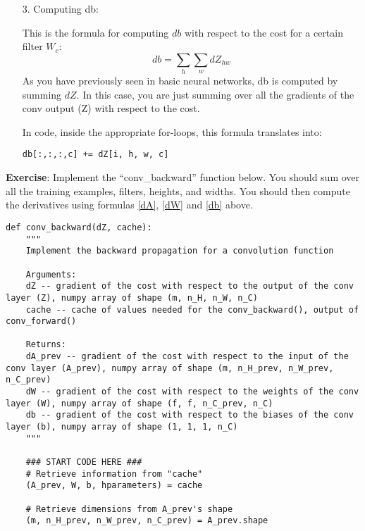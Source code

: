 {\begin{itemize}
In code, inside the appropriate for-loops, this formula translates into:
\begin{verbatim}
dW[:,:,:,c] += a_slice * dZ[i, h, w, c]
\end{verbatim}

\item[3.] Computing db:

This is the formula for computing $db$ with respect to the cost for a certain filter $W_c$:
\begin{equation}\label{db}
 db = \sum_h \sum_w dZ_{hw}
\end{equation}
As you have previously seen in basic neural networks, db is computed by summing $dZ$. In this case, you are just summing over all the gradients of the conv output (Z) with respect to the cost. 

In code, inside the appropriate for-loops, this formula translates into:
\begin{verbatim}
db[:,:,:,c] += dZ[i, h, w, c]
\end{verbatim}

\end{itemize}
{\textbf{Exercise}}: Implement the ``conv\_backward'' function below. You should sum over all the training examples, filters, heights, and widths. You should then compute the derivatives using formulas \eqref{dA}, \eqref{dW} and \eqref{db} above. 

\begin{verbatim}
def conv_backward(dZ, cache):
    """
    Implement the backward propagation for a convolution function
    
    Arguments:
    dZ -- gradient of the cost with respect to the output of the conv layer (Z), numpy array of shape (m, n_H, n_W, n_C)
    cache -- cache of values needed for the conv_backward(), output of conv_forward()
    
    Returns:
    dA_prev -- gradient of the cost with respect to the input of the conv layer (A_prev), numpy array of shape (m, n_H_prev, n_W_prev, n_C_prev)
    dW -- gradient of the cost with respect to the weights of the conv layer (W), numpy array of shape (f, f, n_C_prev, n_C)
    db -- gradient of the cost with respect to the biases of the conv layer (b), numpy array of shape (1, 1, 1, n_C)
    """
    
    ### START CODE HERE ###
    # Retrieve information from "cache"
    (A_prev, W, b, hparameters) = cache
    
    # Retrieve dimensions from A_prev's shape
    (m, n_H_prev, n_W_prev, n_C_prev) = A_prev.shape
    

\end{verbatim}}
